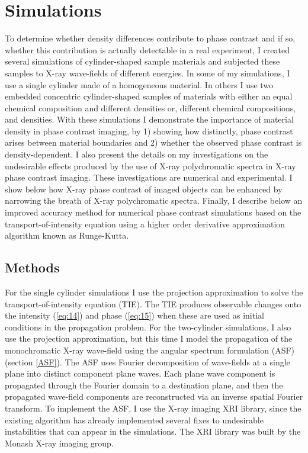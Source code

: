 \documentclass[10pt, a4paper, singlespacing]{report}
\begin{document}
\chapter{Simulations}\label{Simulations}
To determine whether density differences contribute to phase contrast and if so, whether this contribution is actually detectable in a real experiment, I created several simulations of cylinder-shaped sample materials and subjected these samples to X-ray wave-fields of different energies. In some of my simulations, I use a single cylinder made of a homogeneous material. In others I use two embedded concentric cylinder-shaped samples of materials with either an equal chemical composition and different densities or, different chemical compositions, and densities. With these simulations I demonstrate the importance of material density in phase contrast imaging,  by 1) showing how distinctly, phase contrast arises between material boundaries and 2) whether the observed phase contrast is density-dependent. 
I also present the details on my investigations on the undesirable effects produced by the use of X-ray polychromatic spectra in X-ray phase contrast imaging.
These investigations are numerical and experimental. I show below how X-ray phase contrast of imaged objects can be enhanced by narrowing the breath of X-ray polychromatic spectra.
Finally, I describe below an improved accuracy method for numerical phase contrast simulations based on the transport-of-intensity equation using a higher order derivative approximation algorithm known as Runge-Kutta.

\section{Methods}\label{Methods}
For the single cylinder simulations I use the projection approximation to solve the transport-of-intensity equation (TIE). The TIE produces observable changes onto the intensity (\ref{eq:14}) and phase (\ref{eq:15}) when these are used as initial conditions in the propagation problem. For the two-cylinder simulations, I also use the projection approximation, but this time I model the propagation of the monochromatic X-ray wave-field using the angular spectrum formulation (ASF) (section \ref{ASF}). The ASF uses Fourier decomposition of wave-fields at a single plane into distinct component plane waves. Each plane wave component is propagated through the Fourier domain to a destination plane, and then the propagated wave-field components are reconstructed via an inverse spatial Fourier transform\cite{Goodman}. To implement the ASF, I use the X-ray imaging XRI library, since the existing algorithm has already implemented several fixes to undesirable instabilities that can appear in the simulations. The XRI library was built by the Monash X-ray imaging group.
\end{document}
